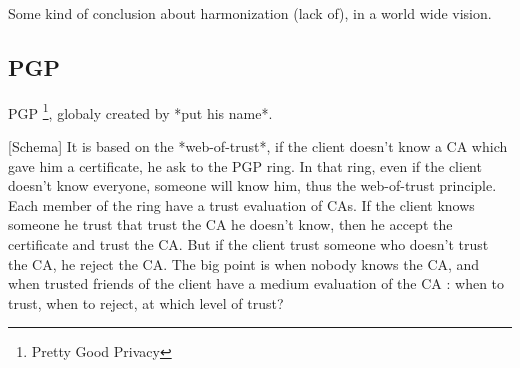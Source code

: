 \documentclass[journal, a4paper]{IEEEtran}
\begin{document}
Some kind of conclusion about harmonization (lack of), in a world wide vision.

\subsection{PGP}

PGP \footnote{Pretty Good Privacy}, globaly created by *put his name*.

[Schema]
It is based on the *web-of-trust*, if the client doesn't know a CA which gave him a certificate, he ask to the PGP ring.
In that ring, even if the client doesn't know everyone, someone will know him, thus the web-of-trust principle.
Each member of the ring have a trust evaluation of CAs. If the client knows someone he trust that trust the CA he doesn't know, then he accept the certificate and trust the CA.
But if the client trust someone who doesn't trust the CA, he reject the CA.
The big point is when nobody knows the CA, and when trusted friends of the client have a medium evaluation of the CA : when to trust, when to reject, at which level of trust?

\end{document}
